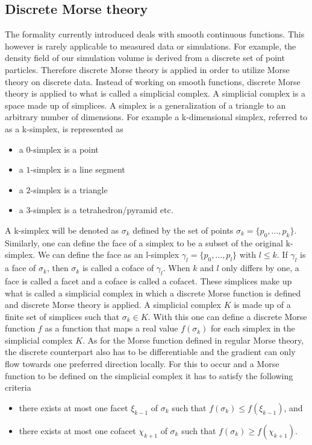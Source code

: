 \subsection{Discrete Morse theory}
The formality currently introduced deals with smooth continuous functions. This
however is rarely applicable to measured data or simulations. For example, the density field
of our simulation volume is derived from a discrete set of
point particles. Therefore discrete
Morse theory\cite{FORMAN199890} is applied in order to utilize Morse theory on
discrete data. Instead of working on smooth functions, discrete Morse theory is
applied to what is called a simplicial complex. A simplicial complex is a space made up
of simplices. A simplex is a generalization of
a triangle to an arbitrary number of dimensions. For example a k-dimensional
simplex, referred to as a k-simplex, is represented as
\begin{itemize}
    \item a $0$-simplex is a point
    \item a $1$-simplex is a line segment
    \item a $2$-simplex is a triangle
    \item a $3$-simplex is a tetrahedron/pyramid etc.
\end{itemize}
A k-simplex will be denoted as $\sigma_k$ defined by the set of points
$\sigma_k=\{p_0, \dots,p_k\}$. Similarly, one can define the face of a simplex
to be a subset of the original k-simplex. We can define the face as an
l-simplex $\gamma_l=\{p_0,\dots,p_l\}$ with $l\leq k$. If $\gamma_l$ is a face
of $\sigma_k$, then $\sigma_k$ is called a coface of $\gamma_l$. When $k$ and
$l$ only differs by one, a face is called a facet and a coface is called a cofacet. These simplices make up
what is called a simplicial complex in which a discrete Morse function is
defined and discrete Morse theory is applied. A simplicial complex $K$ is made
up of a finite set of simplices such that $\sigma_k\in K$. With this one can
define a discrete Morse function $f$ as a function that maps a real value
$f(\sigma_k)$ for each simplex in the simplicial complex $K$. As for the
Morse function defined in regular Morse theory, the discrete counterpart also has
to be differentiable and the gradient can only flow towards one preferred direction
locally. For this to occur and a Morse function to be defined on the simplicial
complex it has to satisfy the following criteria
\begin{itemize}
    \item there exists at most one facet $\xi_{k-1}$ of $\sigma_{k}$ such
    that $f(\sigma_k)\leq f(\xi_{k-1})$, and
    \item there exists at most one cofacet $\chi_{k+1}$ of $\sigma_{k}$ such
    that $f(\sigma_k)\geq f(\chi_{k+1})$.
\end{itemize}
